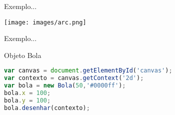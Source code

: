 \documentclass[xcolor=dvipsnames,table]{beamer}
\begin{document}
\begin{frame}{Exemplo...}
	\begin{center}
		\texttt{[image: images/arc.png]}
	\end{center}
\end{frame}

\begin{frame}[fragile]{Exemplo...}
	\begin{block}{Objeto Bola}
		\begin{lstlisting}[language=JavaScript]
var canvas = document.getElementById('canvas');
var contexto = canvas.getContext('2d');
var bola = new Bola(50,'#0000ff');
bola.x = 100;
bola.y = 100;
bola.desenhar(contexto);
\end{lstlisting}	
	\end{block}
\end{frame}

	
	\begin{frame}
		\titlepage
	\end{frame}
	
\end{document}
